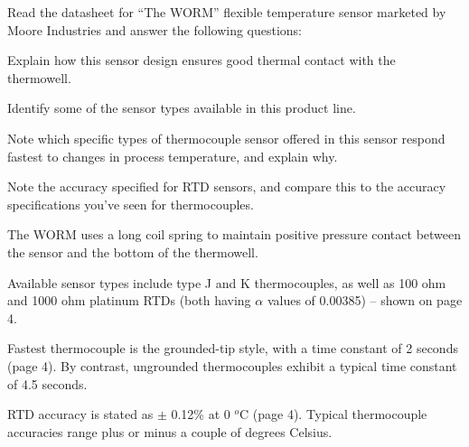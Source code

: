 

Read the datasheet for ``The WORM'' flexible temperature sensor marketed by Moore Industries and answer the following questions:

\vskip 10pt

Explain how this sensor design ensures good thermal contact with the thermowell.

\vskip 10pt

Identify some of the sensor types available in this product line.

\vskip 10pt

Note which specific types of thermocouple sensor offered in this sensor respond fastest to changes in process temperature, and explain why.

\vskip 10pt

Note the accuracy specified for RTD sensors, and compare this to the accuracy specifications you've seen for thermocouples.







The WORM uses a long coil spring to maintain positive pressure contact between the sensor and the bottom of the thermowell.

\vskip 10pt

Available sensor types include type J and K thermocouples, as well as 100 ohm and 1000 ohm platinum RTDs (both having $\alpha$ values of 0.00385) -- shown on page 4.

\vskip 10pt

Fastest thermocouple is the grounded-tip style, with a time constant of 2 seconds (page 4).  By contrast, ungrounded thermocouples exhibit a typical time constant of 4.5 seconds.

\vskip 10pt

RTD accuracy is stated as $\pm$ 0.12\% at 0 $^{o}$C (page 4).  Typical thermocouple accuracies range plus or minus a couple of degrees Celsius.












